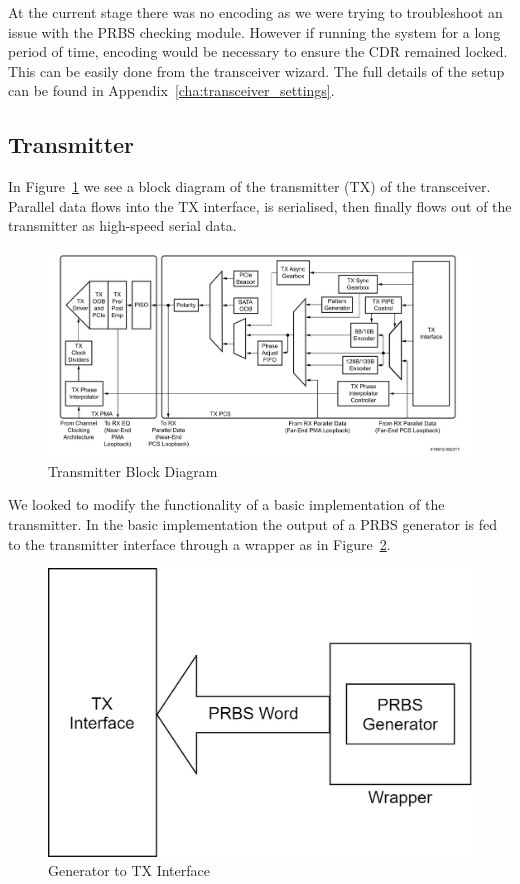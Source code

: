 At the current stage there was no encoding as we were trying to troubleshoot an
issue with the PRBS checking module. However if running the system for a long
period of time, encoding would be necessary to ensure the CDR remained locked.
This can be easily done from the transceiver wizard.
The full details of the setup can be found in
Appendix~\ref{cha:transceiver_settings}.


\cleardoublepage
\subsection{Transmitter}%
\label{sub:transmitter}
In Figure~\ref{fig:transmitter_block} we see a block diagram of the transmitter
(TX) of the transceiver. Parallel data flows into the TX interface,
is serialised, then finally flows out of the transmitter as high-speed
serial data.

\begin{figure}[ht]
    \centering
    \hspace*{-1cm}\includegraphics[width=1.2\linewidth]{img/transmitter_block.png}
    \caption{Transmitter Block Diagram~\cite{GTY_guide} }%
    \label{fig:transmitter_block}
\end{figure}

We looked to modify the functionality of a basic implementation of the
transmitter. In the basic implementation the output of a PRBS generator is fed
to the transmitter interface through a wrapper as in
Figure~\ref{fig:tx_interface}.

\begin{figure}[ht]
    \centering
    \includegraphics[width=0.6\linewidth]{img/tx_interface.png}
    \caption{Generator to TX Interface}%
    \label{fig:tx_interface}
\end{figure}

